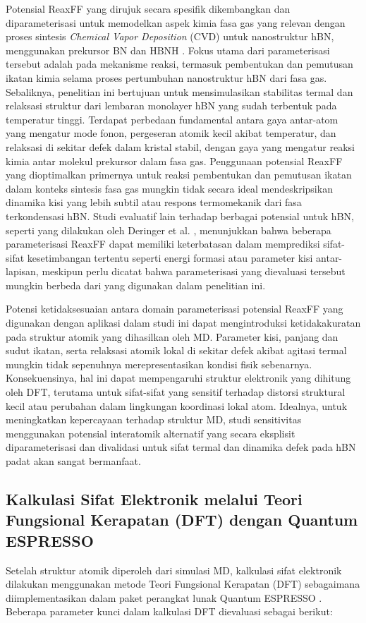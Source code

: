 Potensial ReaxFF yang dirujuk \cite{Ostadhossein2022} secara spesifik dikembangkan dan diparameterisasi untuk memodelkan aspek kimia fasa gas yang relevan dengan proses sintesis \textit{Chemical Vapor Deposition} (CVD) untuk nanostruktur hBN, menggunakan prekursor BN dan HBNH \cite{[1, 2]}. Fokus utama dari parameterisasi tersebut adalah pada mekanisme reaksi, termasuk pembentukan dan pemutusan ikatan kimia selama proses pertumbuhan nanostruktur hBN dari fasa gas. Sebaliknya, penelitian ini bertujuan untuk mensimulasikan stabilitas termal dan relaksasi struktur dari lembaran monolayer hBN yang sudah terbentuk pada temperatur tinggi. Terdapat perbedaan fundamental antara gaya antar-atom yang mengatur mode fonon, pergeseran atomik kecil akibat temperatur, dan relaksasi di sekitar defek dalam kristal stabil, dengan gaya yang mengatur reaksi kimia antar molekul prekursor dalam fasa gas. Penggunaan potensial ReaxFF yang dioptimalkan primernya untuk reaksi pembentukan dan pemutusan ikatan dalam konteks sintesis fasa gas mungkin tidak secara ideal mendeskripsikan dinamika kisi yang lebih subtil atau respons termomekanik dari fasa terkondensasi hBN. Studi evaluatif lain terhadap berbagai potensial untuk hBN, seperti yang dilakukan oleh Deringer et al. \cite{[3]}, menunjukkan bahwa beberapa parameterisasi ReaxFF dapat memiliki keterbatasan dalam memprediksi sifat-sifat kesetimbangan tertentu seperti energi formasi atau parameter kisi antar-lapisan, meskipun perlu dicatat bahwa parameterisasi yang dievaluasi tersebut mungkin berbeda dari yang digunakan dalam penelitian ini.

Potensi ketidaksesuaian antara domain parameterisasi potensial ReaxFF yang digunakan dengan aplikasi dalam studi ini dapat mengintroduksi ketidakakuratan pada struktur atomik yang dihasilkan oleh MD. Parameter kisi, panjang dan sudut ikatan, serta relaksasi atomik lokal di sekitar defek akibat agitasi termal mungkin tidak sepenuhnya merepresentasikan kondisi fisik sebenarnya. Konsekuensinya, hal ini dapat mempengaruhi struktur elektronik yang dihitung oleh DFT, terutama untuk sifat-sifat yang sensitif terhadap distorsi struktural kecil atau perubahan dalam lingkungan koordinasi lokal atom. Idealnya, untuk meningkatkan kepercayaan terhadap struktur MD, studi sensitivitas menggunakan potensial interatomik alternatif yang secara eksplisit diparameterisasi dan divalidasi untuk sifat termal dan dinamika defek pada hBN padat akan sangat bermanfaat.

\subsection{Kalkulasi Sifat Elektronik melalui Teori Fungsional Kerapatan (DFT) dengan Quantum ESPRESSO}
\label{subsec:dft_qe}
Setelah struktur atomik diperoleh dari simulasi MD, kalkulasi sifat elektronik dilakukan menggunakan metode Teori Fungsional Kerapatan (DFT) \cite{Hohenberg1964, Kohn1965} sebagaimana diimplementasikan dalam paket perangkat lunak Quantum ESPRESSO \cite{Giannozzi2009, Giannozzi2017}. Beberapa parameter kunci dalam kalkulasi DFT dievaluasi sebagai berikut:

